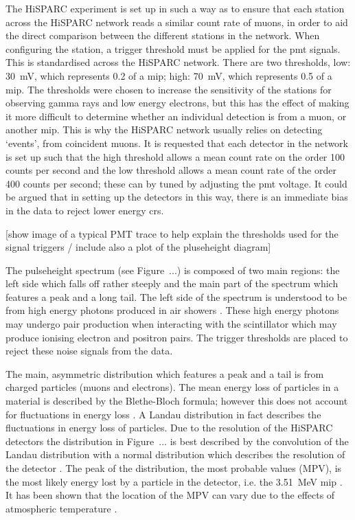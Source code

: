 The HiSPARC experiment is set up in such a way as to ensure that each station across the HiSPARC network reads a similar count rate of muons, in order to aid the direct comparison between the different stations in the network. When configuring the station, a trigger threshold must be applied for the \gls{pmt} signals. This is standardised across the HiSPARC network. There are two thresholds, low: 30~mV, which represents 0.2 of a \gls{mip}; high: 70~mV, which represents 0.5 of a \gls{mip}. The thresholds were chosen to increase the sensitivity of the stations for observing gamma rays and low energy electrons, but this has the effect of making it more difficult to determine whether an individual detection is from a muon, or another \gls{mip}. This is why the HiSPARC network usually relies on detecting `events', from coincident muons. It is requested that each detector in the network is set up such that the high threshold allows a mean count rate on the order 100 counts per second and the low threshold allows a mean count rate of the order 400 counts per second; these can by tuned by adjusting the \gls{pmt} voltage. It could be argued that in setting up the detectors in this way, there is an immediate bias in the data to reject lower energy \glspl{cr}.

[show image of a typical PMT trace to help explain the thresholds used for the signal triggers / include also a plot of the pluseheight diagram]

The pulseheight spectrum (see Figure~...) is composed of two main regions: the left side which falls off rather steeply and the main part of the spectrum which features a peak and a long tail. The left side of the spectrum is understood to be from high energy photons produced in air showers \citep{fokkema_hisparc_2012}. These high energy photons may undergo pair production when interacting with the scintillator which may produce ionising electron and positron pairs. The trigger thresholds are placed to reject these noise signals from the data.

The main, asymmetric distribution which features a peak and a tail is from charged particles (muons and electrons). The mean energy loss of particles in a material is described by the Blethe-Bloch formula; however this does not account for fluctuations in energy loss \citep{fokkema_hisparc_2012}. A Landau distribution in fact describes the fluctuations in energy loss of particles. Due to the resolution of the HiSPARC detectors the distribution in Figure~... is best described by the convolution of the Landau distribution with a normal distribution which describes the resolution of the detector \citep{fokkema_hisparc_2012}. The peak of the distribution, the most probable values (MPV), is the most likely energy lost by a particle in the detector, i.e. the 3.51~MeV \gls{mip} \citep{van_dam_hisparc_2020}. It has been shown that the location of the MPV can vary due to the effects of atmospheric temperature \citep{bartels_hisparc_2012, van_dam_hisparc_2020}.

